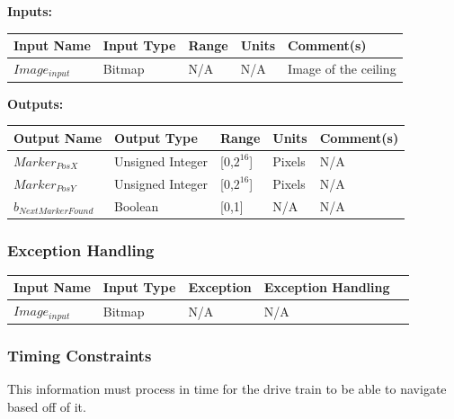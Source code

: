 \documentclass [10pt]{article}
\begin{document}
\textbf{Inputs: } \\

\begin{longtable}{|l|l|l|l|l|}\hline 
	\rowcolor{tableCell}\textbf{Input Name} & \textbf{Input Type} & \textbf{Range} & \textbf{Units} & \textbf{Comment(s)} \\ \hline
	 $ Image_{input} $ & Bitmap &  N/A & N/A & Image of the ceiling  \\ \hline
\end{longtable}


\pagebreak


\textbf{Outputs: } \\

\begin{longtable}{|l|l|l|l|l|}\hline 
	\rowcolor{tableCell}\textbf{Output Name} & \textbf{Output Type} & \textbf{Range} & \textbf{Units} & \textbf{Comment(s)} \\ \hline
	$ Marker_{PosX} $ & Unsigned Integer & [0,$2^{16}$] & Pixels &  N/A\\ \hline
	\rowcolor{tableCell}$ Marker_{PosY} $ & Unsigned Integer & [0,$2^{16}$] & Pixels & N/A\\ \hline
	$ b_{NextMarkerFound} $ & Boolean & [0,1] & N/A & N/A\\ \hline
\end{longtable}

\subsubsection{Exception Handling}

\begin{longtable}{|l|l|l|l|l|}\hline 
	\rowcolor{tableCell}\textbf{Input Name} & \textbf{Input Type} & \textbf{Exception} & \textbf{Exception Handling} \\ \hline
	 $ Image_{input} $ & Bitmap &  N/A & N/A \\ \hline
\end{longtable}


\subsubsection{Timing Constraints}
This information must process in time for the drive train to be able to navigate based off of it.
\end{document}
